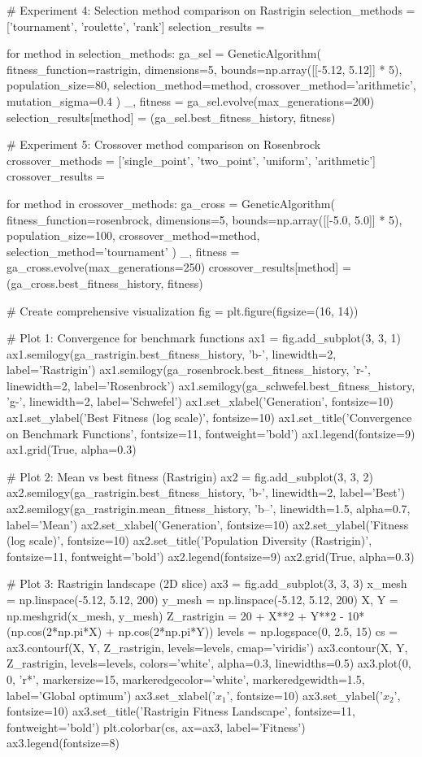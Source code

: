 \documentclass[a4paper, 11pt]{article}
\begin{document}
\begin{pycode}
# Experiment 4: Selection method comparison on Rastrigin
selection_methods = ['tournament', 'roulette', 'rank']
selection_results = {}

for method in selection_methods:
    ga_sel = GeneticAlgorithm(
        fitness_function=rastrigin,
        dimensions=5,
        bounds=np.array([[-5.12, 5.12]] * 5),
        population_size=80,
        selection_method=method,
        crossover_method='arithmetic',
        mutation_sigma=0.4
    )
    _, fitness = ga_sel.evolve(max_generations=200)
    selection_results[method] = (ga_sel.best_fitness_history, fitness)

# Experiment 5: Crossover method comparison on Rosenbrock
crossover_methods = ['single_point', 'two_point', 'uniform', 'arithmetic']
crossover_results = {}

for method in crossover_methods:
    ga_cross = GeneticAlgorithm(
        fitness_function=rosenbrock,
        dimensions=5,
        bounds=np.array([[-5.0, 5.0]] * 5),
        population_size=100,
        crossover_method=method,
        selection_method='tournament'
    )
    _, fitness = ga_cross.evolve(max_generations=250)
    crossover_results[method] = (ga_cross.best_fitness_history, fitness)

# Create comprehensive visualization
fig = plt.figure(figsize=(16, 14))

# Plot 1: Convergence for benchmark functions
ax1 = fig.add_subplot(3, 3, 1)
ax1.semilogy(ga_rastrigin.best_fitness_history, 'b-', linewidth=2, label='Rastrigin')
ax1.semilogy(ga_rosenbrock.best_fitness_history, 'r-', linewidth=2, label='Rosenbrock')
ax1.semilogy(ga_schwefel.best_fitness_history, 'g-', linewidth=2, label='Schwefel')
ax1.set_xlabel('Generation', fontsize=10)
ax1.set_ylabel('Best Fitness (log scale)', fontsize=10)
ax1.set_title('Convergence on Benchmark Functions', fontsize=11, fontweight='bold')
ax1.legend(fontsize=9)
ax1.grid(True, alpha=0.3)

# Plot 2: Mean vs best fitness (Rastrigin)
ax2 = fig.add_subplot(3, 3, 2)
ax2.semilogy(ga_rastrigin.best_fitness_history, 'b-', linewidth=2, label='Best')
ax2.semilogy(ga_rastrigin.mean_fitness_history, 'b--', linewidth=1.5, alpha=0.7, label='Mean')
ax2.set_xlabel('Generation', fontsize=10)
ax2.set_ylabel('Fitness (log scale)', fontsize=10)
ax2.set_title('Population Diversity (Rastrigin)', fontsize=11, fontweight='bold')
ax2.legend(fontsize=9)
ax2.grid(True, alpha=0.3)

# Plot 3: Rastrigin landscape (2D slice)
ax3 = fig.add_subplot(3, 3, 3)
x_mesh = np.linspace(-5.12, 5.12, 200)
y_mesh = np.linspace(-5.12, 5.12, 200)
X, Y = np.meshgrid(x_mesh, y_mesh)
Z_rastrigin = 20 + X**2 + Y**2 - 10*(np.cos(2*np.pi*X) + np.cos(2*np.pi*Y))
levels = np.logspace(0, 2.5, 15)
cs = ax3.contourf(X, Y, Z_rastrigin, levels=levels, cmap='viridis')
ax3.contour(X, Y, Z_rastrigin, levels=levels, colors='white', alpha=0.3, linewidths=0.5)
ax3.plot(0, 0, 'r*', markersize=15, markeredgecolor='white', markeredgewidth=1.5, label='Global optimum')
ax3.set_xlabel('$x_1$', fontsize=10)
ax3.set_ylabel('$x_2$', fontsize=10)
ax3.set_title('Rastrigin Fitness Landscape', fontsize=11, fontweight='bold')
plt.colorbar(cs, ax=ax3, label='Fitness')
ax3.legend(fontsize=8)


\end{pycode}
\end{document}
